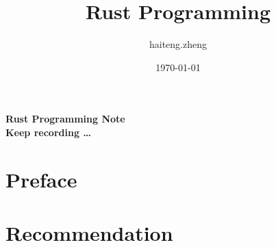 

\title{Rust Programming}
\author{haiteng.zheng}
\date{\today}
%

\thispagestyle{empty}	%
\begin{center}
	{\Huge\bf Rust Programming Note}\\[5mm]
	{\Large\bf Keep recording \dots }
\end{center}
\cleardoublepage

\frontmatter	%
\chapter*{Preface}
\cleardoublepage

\tableofcontents
\cleardoublepage



\mainmatter		%


 
\appendix
\chapter{Recommendation}

%
%

\newpage
\printglossaries

